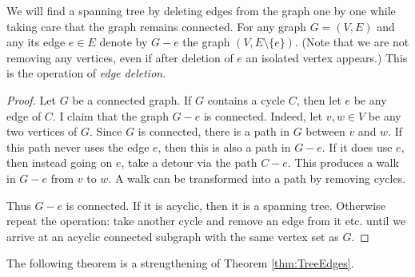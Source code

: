 We will find a spanning tree by deleting edges from the graph one by one while taking care that the graph remains connected.
For any graph $G = (V, E)$ and any its edge $e \in E$ denote by $G - e$ the graph $(V, E \setminus \{e\})$.
(Note that we are not removing any vertices, even if after deletion of $e$ an isolated vertex appears.)
This is the operation of \emph{edge deletion}.
\begin{proof}
Let $G$ be a connected graph.
If $G$ contains a cycle $C$, then let $e$ be any edge of $C$.
I claim that the graph $G - e$ is connected.
Indeed, let $v, w \in V$ be any two vertices of $G$.
Since $G$ is connected, there is a path in $G$ between $v$ and $w$.
If this path never uses the edge $e$, then this is also a path in $G - e$.
If it does use $e$, then instead going on $e$, take a detour via the path $C - e$.
This produces a walk in $G - e$ from $v$ to $w$.
A walk can be transformed into a path by removing cycles.

Thus $G - e$ is connected.
If it is acyclic, then it is a spanning tree.
Otherwise repeat the operation: take another cycle and remove an edge from it etc.
until we arrive at an acyclic connected subgraph with the same vertex set as $G$.
\end{proof}

The following theorem is a strengthening of Theorem \ref{thm:TreeEdges}.